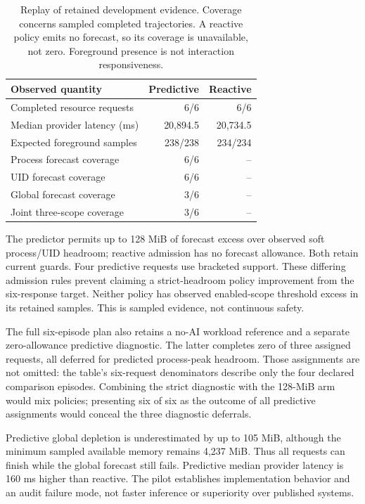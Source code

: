 \documentclass[10pt,twocolumn]{article}
\begin{document}
\begin{table}[t]
\centering\small
\begin{tabular}{lrr}
\toprule
Observed quantity & Predictive & Reactive\\
\midrule
Completed resource requests & 6/6 & 6/6\\
Median provider latency (ms) & 20,894.5 & 20,734.5\\
Expected foreground samples & 238/238 & 234/234\\
Process forecast coverage & 6/6 & --\\
UID forecast coverage & 6/6 & --\\
Global forecast coverage & 3/6 & --\\
Joint three-scope coverage & 3/6 & --\\
\bottomrule
\end{tabular}
\caption{Replay of retained development evidence. Coverage concerns sampled
completed trajectories. A reactive policy emits no forecast, so its coverage is
unavailable, not zero. Foreground presence is not interaction responsiveness.}
\end{table}

The predictor permits up to 128 MiB of forecast excess over observed soft
process/UID headroom; reactive admission has no forecast allowance. Both retain
current guards. Four predictive requests use bracketed support. These differing
admission rules prevent claiming a strict-headroom policy improvement from the
six-response target. Neither policy has observed enabled-scope threshold excess
in its retained samples. This is sampled evidence, not continuous safety.

The full six-episode plan also retains a no-AI workload reference and a separate
zero-allowance predictive diagnostic. The latter completes zero of three assigned
requests, all deferred for predicted process-peak headroom. Those assignments
are not omitted: the table's six-request denominators describe only the four
declared comparison episodes. Combining the strict diagnostic with the
128-MiB arm would mix policies; presenting six of six as the outcome of all
predictive assignments would conceal the three diagnostic deferrals.

Predictive global depletion is underestimated by up to 105 MiB, although the
minimum sampled available memory remains 4,237 MiB. Thus all requests can finish
while the global forecast still fails. Predictive median provider latency is
160 ms higher than reactive. The pilot establishes implementation behavior and
an audit failure mode, not faster inference or superiority over published systems.
\end{document}
